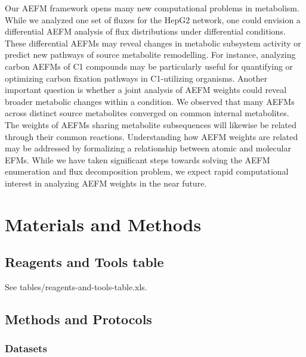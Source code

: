 \documentclass[12pt]{article}
\begin{document}
Our AEFM framework opens many new computational problems in metabolism.
While we analyzed one set of fluxes for the HepG2 network, one could
envision a differential AEFM analysis of flux distributions under
differential conditions. These differential AEFMs may reveal changes in
metabolic subsystem activity or predict new pathways of source metabolite
remodelling. For instance, analyzing carbon AEFMs of C1 compounds may be
particularly useful for quantifying or optimizing carbon fixation pathways
in C1-utilizing organisms. Another important question is whether a joint
analysis of AEFM weights could reveal broader metabolic changes
within a condition. We observed that many AEFMs across distinct source
metabolites converged on common internal metabolites. The weights of AEFMs
sharing metabolite subsequences will likewise be related through their
common reactions. Understanding how AEFM weights are related may be
addressed by formalizing a relationship between atomic and molecular EFMs.
While we have taken significant steps towards solving the AEFM enumeration
and flux decomposition problem, we expect rapid computational interest in
analyzing AEFM weights in the near future.

\section*{Materials and Methods}

\subsection*{Reagents and Tools table}

See tables/reagents-and-tools-table.xls.

\subsection*{Methods and Protocols}

\subsubsection*{Datasets}
\end{document}
